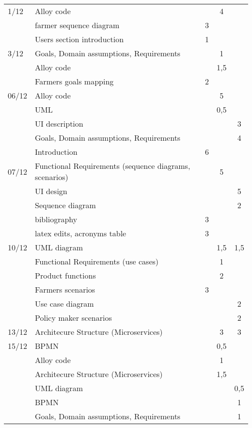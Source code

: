 \begin{center}
\begin{longtable}{llccc}
        \hline
        1/12	&	Alloy code	&		&	4	&		\\
        	&	farmer sequence diagram	&	3	&		&		\\
        	&	Users section introduction	&	1	&		&		\\
        \hline
        3/12	&	Goals, Domain assumptions, Requirements	&		&	1	&		\\
        	&	Alloy code	&		&	1,5	&		\\
        	&	Farmers goals mapping	&	2	&		&		\\
        \hline
        06/12	&	Alloy code	&		&	5	&		\\
        	&	UML	&		&	0,5	&		\\
        	&	UI description	&		&		&	3	\\
        	&	Goals, Domain assumptions, Requirements	&		&		&	4	\\
        	&	Introduction	&	6	&		&		\\
        \hline
        07/12	&	Functional Requirements (sequence diagrams, scenarios)	&		&	5	&		\\
        	&	UI design	&		&		&	5	\\
        	&	Sequence diagram	&		&		&	2	\\
        	&	bibliography	&	3	&		&		\\
        	&	latex edits, acronyms table	&	3	&		&		\\
        \hline
        10/12	&	UML diagram	&		&	1,5	&	1,5	\\
        	&	Functional Requirements (use cases)	&		&	1	&		\\
        	&	Product functions	&		&	2	&		\\
        	&	Farmers scenarios	&	3	&		&		\\
        	&	Use case diagram	&		&		&	2	\\
        	&	Policy maker scenarios	&		&		&	2	\\
        \hline
        13/12	&	Architecure Structure (Microservices)	&		&	3	&	3	\\
        \hline
        15/12	&	BPMN	&		&	0,5	&		\\
        	&	Alloy code	&		&	1	&		\\
        	&	Architecure Structure (Microservices)	&		&	1,5	&		\\
        	&	UML diagram	&		&		&	0,5	\\
        	&	BPMN	&		&		&	1	\\
        	&	Goals, Domain assumptions, Requirements	&		&		&	1	\\

\end{longtable}
\end{center}
